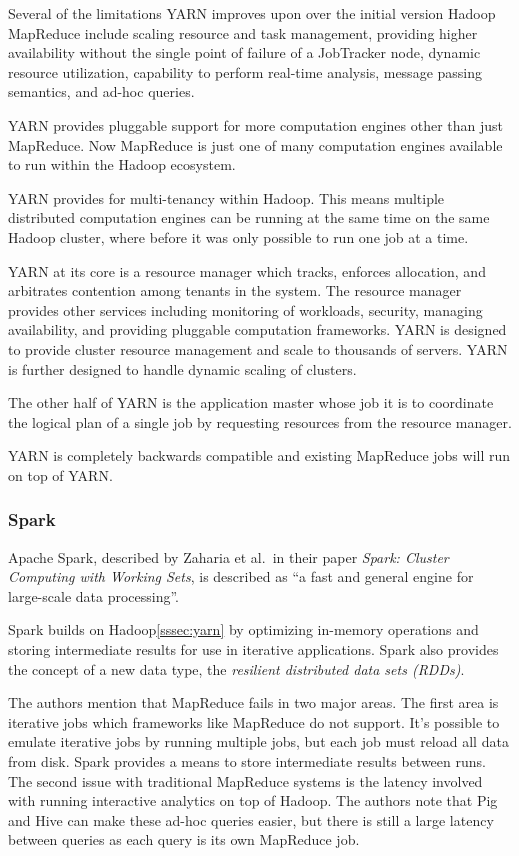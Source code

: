 \documentclass[]{article}
\begin{document}
Several of the limitations YARN improves upon over the initial version Hadoop MapReduce include scaling resource and task management, providing higher availability without the single point of failure of a JobTracker node, dynamic resource utilization, capability to perform real-time analysis, message passing semantics, and ad-hoc queries.

YARN provides pluggable support for more computation engines other than just MapReduce. Now MapReduce is just one of many computation engines available to run within the Hadoop ecosystem.

YARN provides for multi-tenancy within Hadoop. This means multiple distributed computation engines can be running at the same time on the same Hadoop cluster, where before it was only possible to run one job at a time.

YARN at its core is a resource manager which tracks, enforces allocation, and arbitrates contention among tenants in the system. The resource manager provides other services including monitoring of workloads, security, managing availability, and providing pluggable computation frameworks. YARN is designed to provide cluster resource management and scale to thousands of servers. YARN is further designed to handle dynamic scaling of clusters.

The other half of YARN is the application master whose job it is to coordinate the logical plan of a single job by requesting resources from the resource manager.

YARN is completely backwards compatible and existing MapReduce jobs will run on top of YARN.

\subsubsection{Spark}\label{sssec:spark}
Apache Spark, described by Zaharia et al.\ in their paper \textit{Spark: Cluster Computing with Working Sets}\cite{zaharia_spark:_2010}, is described as ``a fast and general engine for large-scale data processing''.

Spark builds on Hadoop\ref{sssec:yarn} by optimizing in-memory operations and storing intermediate results for use in iterative applications. Spark also provides the concept of a new data type, the \textit{resilient distributed data sets (RDDs)}.

The authors mention that MapReduce fails in two major areas. The first area is iterative jobs which frameworks like MapReduce do not support. It's possible to emulate iterative jobs by running multiple jobs, but each job must reload all data from disk. Spark provides a means to store intermediate results between runs. The second issue with traditional MapReduce systems is the latency involved with running interactive analytics on top of Hadoop. The authors note that Pig and Hive can make these ad-hoc queries easier, but there is still a large latency between queries as each query is its own MapReduce job.
\end{document}
